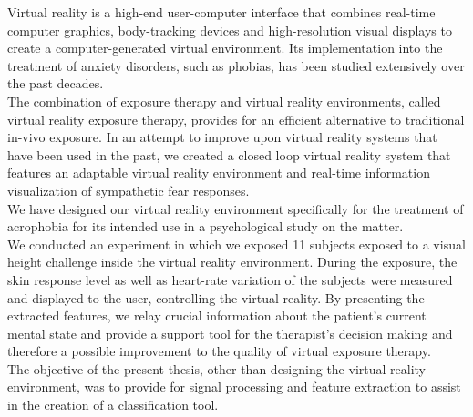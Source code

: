 
Virtual reality is a high-end user-computer interface that combines real-time computer graphics, body-tracking devices and high-resolution visual displays to create a computer-generated virtual environment. Its implementation into the treatment of anxiety disorders, such as phobias, has been studied extensively over the past decades. \\
The combination of exposure therapy and virtual reality environments, called virtual reality exposure therapy, provides for an efficient alternative to traditional in-vivo exposure. In an attempt to improve upon virtual reality systems that have been used in the past, we created a closed loop virtual reality system that features an adaptable virtual reality environment and real-time information visualization of sympathetic fear responses.\\
We have designed our virtual reality environment specifically for the treatment of acrophobia for its intended use in a psychological study on the matter.\\
We conducted an experiment in which we exposed 11 subjects exposed to a visual height challenge inside the virtual reality environment. During the exposure, the skin response level as well as heart-rate variation of the subjects were measured and displayed to the user, controlling the virtual reality. By presenting the extracted features, we relay crucial information about the patient's current mental state and provide a support tool for the therapist's decision making and therefore a possible improvement to the quality of virtual exposure therapy. \\
The objective of the present thesis, other than designing the virtual reality environment, was to provide for signal processing and feature extraction to assist in the creation of a classification tool.   




